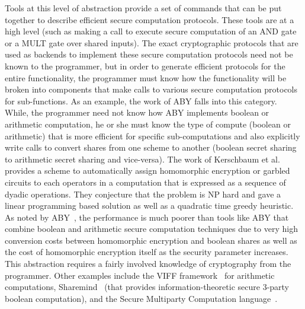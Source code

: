  Tools at this level of abstraction provide a set of commands that can be put together to describe efficient secure computation protocols. These tools are at a high level (such as making a call to execute secure computation of an AND gate or a MULT gate over shared inputs). The exact cryptographic protocols that are used as backends to implement these secure computation protocols need not be known to the programmer, but in order to generate efficient protocols for the entire functionality, the programmer must know how the functionality will be broken into components that make calls to various secure computation protocols for sub-functions. As an example, the work of ABY \cite{aby} falls into this category. While, the programmer need not know how ABY implements boolean or arithmetic computation, he or she must know the type of compute (boolean or arithmetic) that is more efficient for specific sub-computations and also explicitly write calls to convert shares from one scheme to another (boolean secret sharing to arithmetic secret sharing and vice-versa). The work of Kerschbaum et al.~\cite{autoS} provides a scheme to automatically assign homomorphic encryption or garbled circuits to each operators in a computation that is expressed as a sequence of dyadic operations. They conjecture that the problem is NP hard and gave a linear programming based solution
as well as a quadratic time greedy heuristic. As noted by ABY~\cite{aby}, the performance is much poorer than tools like ABY that combine boolean and arithmetic secure computation techniques due to very high conversion costs between homomorphic encryption and boolean shares as well as the cost of homomorphic encryption itself as the security parameter increases. This abstraction requires a fairly involved knowledge of cryptography from the programmer. %
Other examples include the VIFF framework~\cite{viff} for arithmetic computations, Sharemind~\cite{sharemind} (that provides information-theoretic secure 3-party boolean computation), and the Secure Multiparty Computation language~\cite{nsy04,securemc}. 
